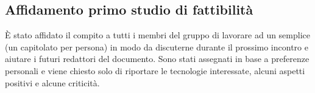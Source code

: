 \subsection{Affidamento primo studio di fattibilità}
È stato affidato il compito a tutti i membri del gruppo di lavorare ad un semplice \SdF{} (un capitolato per persona) in modo da discuterne durante il prossimo incontro e aiutare i futuri redattori del documento. Sono stati assegnati in base a preferenze personali e viene chiesto solo di riportare le tecnologie interessate, alcuni aspetti positivi e alcune criticità.
